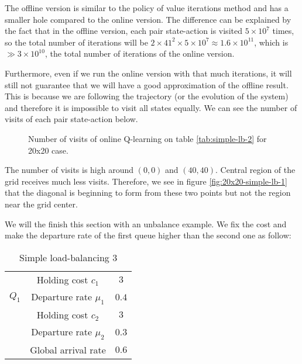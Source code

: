 \documentclass[
  a4paper, xcolor = usenames,dvipsnames]{article}
\theoremstyle{definition}
\theoremstyle{definition}
\theoremstyle{definition}
\theoremstyle{definition}
\theoremstyle{remark}
\begin{document}
The offline version is similar to the policy of value iterations method and has a smaller hole compared to the online version. The difference can be explained by the fact that in the offline version, each pair state-action is visited \(5 \times 10^{7}\) times, so the total number of iterations will be \(2 \times 41^{2} \times 5 \times 10^{7} \approx 1.6 \times 10^{11}\), which is \(\gg 3 \times 10^{10}\), the total number of iterations of the online version.

Furthermore, even if we run the online version with that much iterations, it will still not guarantee that we will have a good approximation of the offline result. This is because we are following the trajectory (or the evolution of the system) and therefore it is impossible to visit all states equally. We can see the number of visits of each pair state-action below.



\begin{figure}

{\centering {}

}

\caption{Number of visits of online Q-learning on table \ref{tab:simple-lb-2} for 20x20 case.}\label{fig:20x20-simple-lb-2-n-visit}
\end{figure}

The number of visits is high around \((0, 0)\) and \((40, 40)\). Central region of the grid receives much less visits. Therefore, we see in figure \ref{fig:20x20-simple-lb-1} that the diagonal is beginning to form from these two points but not the region near the grid center.

We will the finish this section with an unbalance example. We fix the cost and make the departure rate of the first queue higher than the second one as follow:

\begin{table}[!htbp]
\caption{Simple load-balancing 3}
\begin{center}
\begin{tabular}{c c c}
    \hline
    \multirow{3}{*}{$Q_{1}$} & Holding cost $c_{1}$ & $3$ \\
    & Departure rate $\mu_{1}$ & $0.4$ \\
    \cline{2-3}
    \multirow{3}{*}{$Q_{2}$} & Holding cost $c_{2}$ & $3$ \\
    & Departure rate $\mu_{2}$ & $0.3$ \\
    \cline{2-3}
    & Global arrival rate & $0.6$ \\    
    \hline
\end{tabular}
\end{center}
\label{tab:simple-lb-3}
\end{table}
\end{document}
